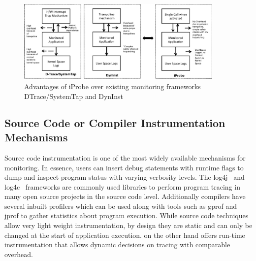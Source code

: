 
\begin{figure}[ht]
	\begin{center}
		\includegraphics[width=0.9\textwidth]{iprobe/Images/related.eps}
		\caption{Advantages of iProbe over existing monitoring frameworks DTrace/SystemTap and DynInst}
		\label{fig:related}
	\end{center}
\end{figure}

\subsection{Source Code or Compiler Instrumentation Mechanisms}
Source code instrumentation is one of the most widely available mechanisms for monitoring. 
In essence, users can insert debug statements with runtime flags to dump and inspect program status with varying verbosity levels. 
The log4j~\cite{log4j} and log4c~\cite{log4c} frameworks are commonly used libraries to perform program tracing in many open source projects in the source code level. 
Additionally compilers have several inbuilt profilers which can be used along with tools such as gprof and jprof to gather statistics about program execution.
While source code techniques allow very light weight instrumentation, by design they are static and can only be changed at the start of application execution. 
\iprobe on the other hand offers run-time instrumentation that allows dynamic decisions on tracing with comparable overhead.


